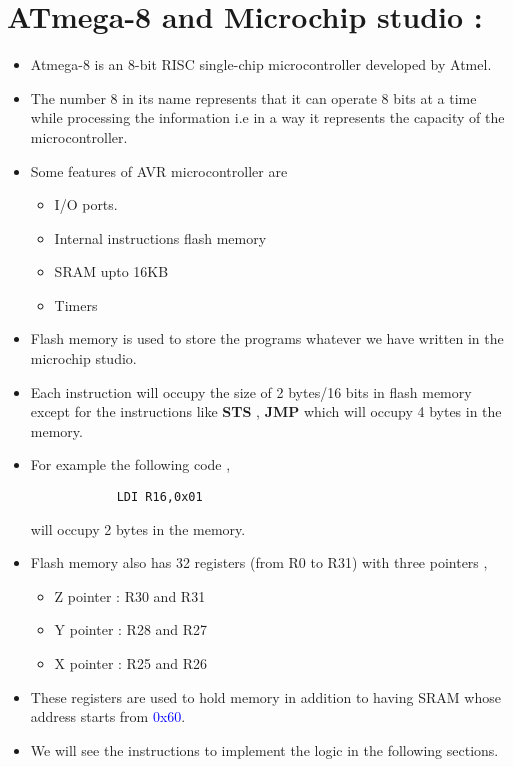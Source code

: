 \documentclass{article}
\begin{document}
\section*{ATmega-8 and Microchip studio :}
\begin{itemize}
    \item Atmega-8 is an 8-bit RISC single-chip microcontroller developed by Atmel.
    \item The number 8 in its name represents that it can operate 8 bits at a time while processing the information i.e in a way it represents the capacity of the microcontroller.
    \item Some features of AVR microcontroller are
    \begin{itemize}
        \item I/O ports.
        \item Internal instructions flash memory
        \item SRAM upto 16KB
        \item Timers
    \end{itemize}
    \item Flash memory is used to store the programs whatever we have written in the microchip studio.
    \item Each instruction will occupy the size of 2 bytes/16 bits in flash memory except for the instructions like \textbf{STS} , \textbf{JMP} which will occupy 4 bytes in the memory.
    \item For example the following code ,
    {\renewcommand\fcolorbox[4][]{\textcolor{cyan}{\strut#4}}
        \begin{verbatim}
            LDI R16,0x01
        \end{verbatim}
    }
    will occupy 2 bytes in the memory.
    \item Flash memory also has 32 registers (from R0 to R31) with three pointers ,
    \begin{itemize}
        \item Z pointer : R30 and R31
        \item Y pointer : R28 and R27
        \item X pointer : R25 and R26
    \end{itemize}
    \item These registers are used to hold memory in addition to having SRAM whose address starts from \textcolor{blue}{0x60}.
    \item We will see the instructions to implement the logic in the following sections.
\end{itemize}



\end{document}
